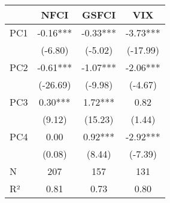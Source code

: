 \begingroup
\fontsize{12.0pt}{14.4pt}\selectfont
\begin{tabular}{lccc}
\toprule
  & NFCI & GSFCI & VIX \\ 
\midrule\addlinespace[2.5pt]
PC1 & -0.16*** & -0.33*** & -3.73*** \\ 
 & (-6.80) & (-5.02) & (-17.99) \\ 
PC2 & -0.61*** & -1.07*** & -2.06*** \\ 
 & (-26.69) & (-9.98) & (-4.67) \\ 
PC3 & 0.30*** & 1.72*** & 0.82 \\ 
 & (9.12) & (15.23) & (1.44) \\ 
PC4 & 0.00 & 0.92*** & -2.92*** \\ 
{} & {(0.08)} & {(8.44)} & {(-7.39)} \\ 
\midrule\addlinespace[2.5pt]
  N & 207 & 157 & 131 \\ 
R² & 0.81 & 0.73 & 0.80 \\ 
\bottomrule
\end{tabular}
\endgroup

